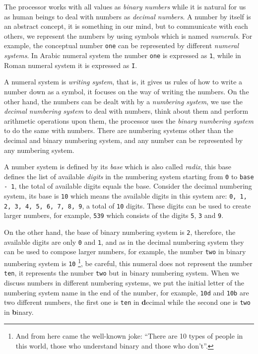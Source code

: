 The processor works with all values as \emph{binary numbers} while it is
natural for us as human beings to deal with numbers as \emph{decimal
numbers}. A number by itself is an abstract concept, it is something in
our mind, but to communicate with each others, we represent the numbers
by using symbols which is named \emph{numerals}. For example, the
conceptual number \lstinline!one! can be represented by different
\emph{numeral systems}. In Arabic numeral system the number
\lstinline!one! is expressed as \lstinline!1!, while in Roman numeral
system it is expressed as \lstinline!I!.

A numeral system is \emph{writing system}, that is, it gives us rules of
how to write a number down as a symbol, it focuses on the way of writing
the numbers. On the other hand, the numbers can be dealt with by a
\emph{numbering system}, we use the \emph{decimal numbering system} to
deal with numbers, think about them and perform arithmetic operations
upon them, the processor uses the \emph{binary numbering system} to do
the same with numbers. There are numbering systems other than the
decimal and binary numbering system, and any number can be represented
by any numbering system.

A number system is defined by its \emph{base} which is also called
\emph{radix}, this base defines the list of available \emph{digits} in
the numbering system starting from \lstinline!0! to
\lstinline!base - 1!, the total of available digits equals the base.
Consider the decimal numbering system, its base is \lstinline!10! which
means the available digits in this system are:
\lstinline!0, 1, 2, 3, 4, 5, 6, 7, 8, 9!, a total of \lstinline!10!
digits. These digits can be used to create larger numbers, for example,
\lstinline!539! which consists of the digits \lstinline!5!,
\lstinline!3! and \lstinline!9!.

On the other hand, the base of binary numbering system is \lstinline!2!,
therefore, the available digits are only \lstinline!0! and
\lstinline!1!, and as in the decimal numbering system they can be used
to compose larger numbers, for example, the number \lstinline!two! in
binary numbering system is \lstinline!10! \footnote{And from here came
  the well-known joke: ``There are 10 types of people in this world,
  those who understand binary and those who don't''.}, be careful, this
numeral does not represent the number \lstinline!ten!, it represents the
number \lstinline!two! but in binary numbering system. When we discuss
numbers in different numbering systems, we put the initial letter of the
numbering system name in the end of the number, for example,
\lstinline!10d! and \lstinline!10b! are two different numbers, the first
one is \lstinline!ten! in \textbf{d}ecimal while the second one is
\lstinline!two! in \textbf{b}inary.


